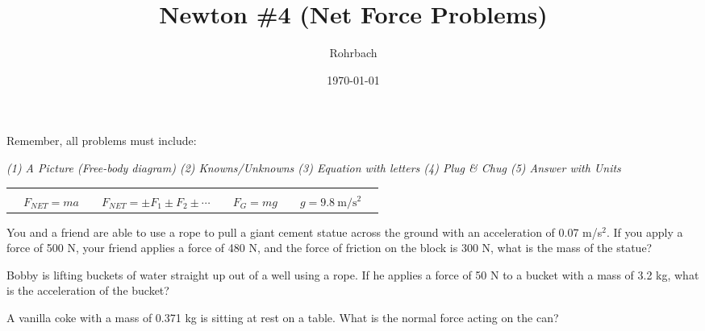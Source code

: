 \documentclass[10pt]{exam}
\title{Newton \#4 (Net Force Problems)}
\author{Rohrbach}
\date{\today}
\newcommand{\printeqs}{
  \begin{center}
    \begin{tabular}{|*9c|}
      \hline 
      &&&&&&&&\\
      &
      $F_{NET}=ma$ &&
      $F_{NET}=\pm F_1 \pm F_2 \pm \cdots$ &&
      $F_G=mg$ &&
      $g=\SI{9.8}{\meter\per\second^2}$ &
      \\
      \hline
    \end{tabular}
  \end{center}
}
\begin{document}
\maketitle

\noindent
Remember, all problems must include:

\begin{center}
  \it
   (1) A Picture (Free-body diagram) \hspace{3em}    
   (2) Knowns/Unknowns \hspace{3em}    
   (3) Equation with letters \hspace{3em}
   (4) Plug \& Chug  \hspace{5em}
   (5) Answer with Units
\end{center}

\printeqs

\begin{questions}
  
    \question
      You and a friend are able to use a rope to pull a giant cement statue across the ground with an acceleration of 0.07 m/s$^2$.  If you apply a force of 500 N, your friend applies a force of 480 N, and the force of friction on the block is 300 N, what is the mass of the statue?
      \vs[3]


    \question
      Bobby is lifting buckets of water straight up out of a well using a rope.  If he applies a force of 50 N to a bucket with a mass of 3.2 kg, what is the acceleration of the bucket?
      \vs[3]

    \question
      A vanilla coke with a mass of 0.371 kg is sitting at rest on a table.  What is the normal force acting on the can?
      \vs[2]

  

\end{questions}
\end{document}
